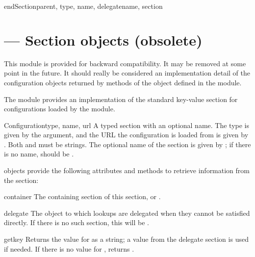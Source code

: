 \documentclass{howto}
\begin{document}
\begin{methoddesc}{endSection}{parent, type, name, delegatename, section}
\end{methoddesc}


\section{ --- Section objects (obsolete)}



\begin{notice}[warning]
  This module is provided for backward compatibility.  It may be
  removed at some point in the future.  It should really be considered
  an implementation detail of the configuration objects returned by
  methods of the  object defined in the
   module.
\end{notice}

The  module provides an implementation of the
standard key-value section for configurations loaded by the
 module.

\begin{classdesc}{Configuration}{type, name, url}
  A typed section with an optional name.  The type is given by the
   argument, and the URL the configuration is loaded from is
  given by .  Both  and  must be strings.
  The optional name of the section is given by ; if there is
  no name,  should be .
\end{classdesc}

 objects provide the following attributes and
methods to retrieve information from the section:

\begin{memberdesc}[Configuration]{container}
  The containing section of this section, or .
\end{memberdesc}

\begin{memberdesc}[Configuration]{delegate}
  The  object to which lookups are delegated when
  they cannot be satisfied directly.  If there is no such section,
  this will be .
\end{memberdesc}

\begin{methoddesc}[Configuration]{get}{key}
  Returns the value for  as a string; a value from the
  delegate section is used if needed.  If there is no value for
  , returns .
\end{methoddesc}
\end{document}
